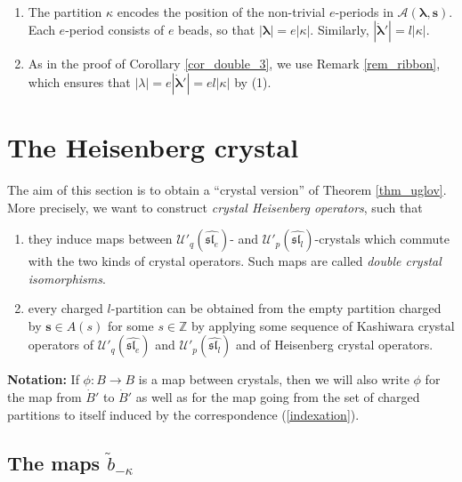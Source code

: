 \documentclass[twoside,12pt]{amsart}
\theoremstyle{plain}
\newcommand{\cA}{\mathcal{A}}
\newcommand{\Z}{\mathbb{Z}}
\newcommand{\bs}{\mathbf{s}}
\newcommand{\la}{\lambda}
\newcommand{\ka}{\kappa}
\newcommand{\bla}{\boldsymbol{\la}}
\newcommand{\tb}{\tilde{b}}
\newcommand{\dB}{\dot{B}}
\newcommand{\dbla}{\dot{\bla}}
\newcommand{\lra}{\longrightarrow}
\newcommand{\Ue}{\mathcal{U}'_q (\widehat{\mathfrak{sl}_e})}
\newcommand{\Ul}{\mathcal{U}'_p (\widehat{\mathfrak{sl}_l})}
\theoremstyle{remark}
\begin{document}
\proof \
\begin{enumerate}
\item The partition $\ka$ encodes the position of the non-trivial $e$-periods in $\cA(\bla,\bs)$.
Each $e$-period consists of $e$ beads, so that $|\bla| = e |\ka|$.
Similarly, $|\dbla'| = l |\ka|$.
\item As in the proof of Corollary \ref{cor_double_3}, we use Remark \ref{rem_ribbon},
which ensures that $|\la| = e |\dbla'| = el |\ka|$ by (1).
\end{enumerate}
\endproof





















\section{The Heisenberg crystal}\label{heiscrys}

The aim of this section is to obtain a ``crystal version'' of Theorem \ref{thm_uglov}.
More precisely, we want to construct \textit{crystal Heisenberg operators},
such that 
\begin{enumerate}
 \item they induce maps between $\Ue$- and $\Ul$-crystals which commute with
the two kinds of crystal operators. Such maps are called \textit{double crystal isomorphisms}.
 \item every charged $l$-partition can be obtained from the empty partition
 charged by $\bs\in A(s)$ for some $s\in\Z$ by applying some sequence of
 Kashiwara crystal operators of $\Ue$ and $\Ul$ and of Heisenberg crystal operators.
\end{enumerate}

\textbf{Notation: } If $\phi: B\lra B$ is a map between crystals, then
we will also write $\phi$ for the map from $\dB'$ to $\dB'$
as well as for the map going from the set of charged partitions to itself
induced by the correspondence (\ref{indexation}).

\subsection{The maps $\tb_{-\ka}$} \label{btilde}\
\end{document}
